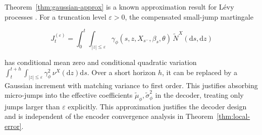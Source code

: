 \documentclass{article}
\newcommand{\dd}{\mathrm{d}}
\begin{document}
Theorem~\ref{thm:gaussian-approx} is a known approximation result for L\'evy processes \citep{asmussen2001approximations}. For a truncation level \(\varepsilon>0\), the compensated small-jump martingale

\[
J_t^{(\varepsilon)} = \int_0^t\int_{|z|\le \varepsilon} \gamma_{\phi}(s,z,X_{s^-},\beta_s,\theta)\,\widetilde N^X(\dd s,\dd z)
\]

has conditional mean zero and conditional quadratic variation \(\int_t^{t+h}\int_{|z|\le \varepsilon} \gamma_{\phi}^2\,\nu^X(\dd z)\dd s\). Over a short horizon \(h\), it can be replaced by a Gaussian increment with matching variance to first order. This justifies absorbing micro-jumps into the effective coefficients \(\tilde\mu_{\phi},\tilde\sigma_{\phi}^2\) in the decoder, treating only jumps larger than \(\varepsilon\) explicitly. This approximation justifies the decoder design and is independent of the encoder convergence analysis in Theorem~\ref{thm:local-error}.
\end{document}
